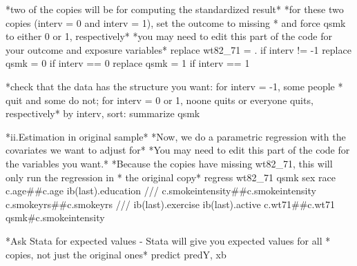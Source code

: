 \documentclass[
  10pt,
  a4paper,
]{book}
\newenvironment{Shaded}{\begin{snugshade}}{\end{snugshade}}
\newcommand{\CommentTok}[1]{\textcolor[rgb]{0.37,0.37,0.37}{#1}}
\newcommand{\FunctionTok}[1]{\textcolor[rgb]{0.28,0.35,0.67}{#1}}
\newcommand{\KeywordTok}[1]{\textcolor[rgb]{0.00,0.46,0.62}{#1}}
\newcommand{\NormalTok}[1]{\textcolor[rgb]{0.00,0.46,0.62}{#1}}
\newcommand{\OtherTok}[1]{\textcolor[rgb]{0.00,0.46,0.62}{#1}}
\begin{document}
\begin{Shaded}
\begin{Highlighting}[]
\NormalTok{*}\KeywordTok{two} \KeywordTok{of}\NormalTok{ the copies will }\KeywordTok{be} \KeywordTok{for}\NormalTok{ computing the standardized result*}
\NormalTok{*}\KeywordTok{for}\NormalTok{ these }\KeywordTok{two}\NormalTok{ copies (interv = 0 and interv = 1), }\KeywordTok{set}\NormalTok{ the outcome to }\FunctionTok{missing}
\NormalTok{* and }\KeywordTok{force}\NormalTok{ qsmk to either 0 }\KeywordTok{or}\NormalTok{ 1, respectively*}
\NormalTok{*you may need to edit }\KeywordTok{this}\NormalTok{ part }\KeywordTok{of}\NormalTok{ the code }\KeywordTok{for}\NormalTok{ your outcome and exposure variables*}
\KeywordTok{replace}\NormalTok{ wt82\_71 = . }\KeywordTok{if}\NormalTok{ interv != {-}1}
\KeywordTok{replace}\NormalTok{ qsmk = 0 }\KeywordTok{if}\NormalTok{ interv == 0}
\KeywordTok{replace}\NormalTok{ qsmk = 1 }\KeywordTok{if}\NormalTok{ interv == 1}

\NormalTok{*check that the }\KeywordTok{data}\NormalTok{ has the structure you want: }\KeywordTok{for}\NormalTok{ interv = {-}1, some people}
\NormalTok{* quit and some }\KeywordTok{do} \KeywordTok{not}\NormalTok{; }\KeywordTok{for}\NormalTok{ interv = 0 }\KeywordTok{or}\NormalTok{ 1, noone quits }\KeywordTok{or}\NormalTok{ everyone quits, respectively*}
\KeywordTok{by}\NormalTok{ interv, }\KeywordTok{sort}\NormalTok{: }\KeywordTok{summarize}\NormalTok{ qsmk}

\NormalTok{*ii.Estimation }\KeywordTok{in}\NormalTok{ original }\KeywordTok{sample}\NormalTok{*}
\NormalTok{*Now, we }\KeywordTok{do}\NormalTok{ a parametric regression with the covariates we want to }\KeywordTok{adjust} \KeywordTok{for}\NormalTok{*}
\NormalTok{*You may need to edit }\KeywordTok{this}\NormalTok{ part }\KeywordTok{of}\NormalTok{ the code }\KeywordTok{for}\NormalTok{ the variables you want.*}
\NormalTok{*Because the copies have }\FunctionTok{missing}\NormalTok{ wt82\_71, }\KeywordTok{this}\NormalTok{ will only }\KeywordTok{run}\NormalTok{ the regression }\KeywordTok{in} 
\NormalTok{* the original copy*}
\KeywordTok{regress}\NormalTok{ wt82\_71 qsmk sex race c.age\#\#c.age ib(}\FunctionTok{last}\NormalTok{).education }\CommentTok{///}
\NormalTok{c.smokeintensity\#\#c.smokeintensity c.smokeyrs\#\#c.smokeyrs }\CommentTok{///}
\NormalTok{ib(}\FunctionTok{last}\NormalTok{).exercise ib(}\FunctionTok{last}\NormalTok{).active c.wt71\#\#c.wt71 qsmk\#c.smokeintensity}

\NormalTok{*Ask Stata }\KeywordTok{for}\NormalTok{ expected }\KeywordTok{values}\NormalTok{ {-} Stata will give you expected }\KeywordTok{values} \KeywordTok{for} \OtherTok{all} 
\NormalTok{* copies, }\KeywordTok{not}\NormalTok{ just the original ones*}
\KeywordTok{predict}\NormalTok{ predY, }\KeywordTok{xb}


\end{Highlighting}
\end{Shaded}
\end{document}
